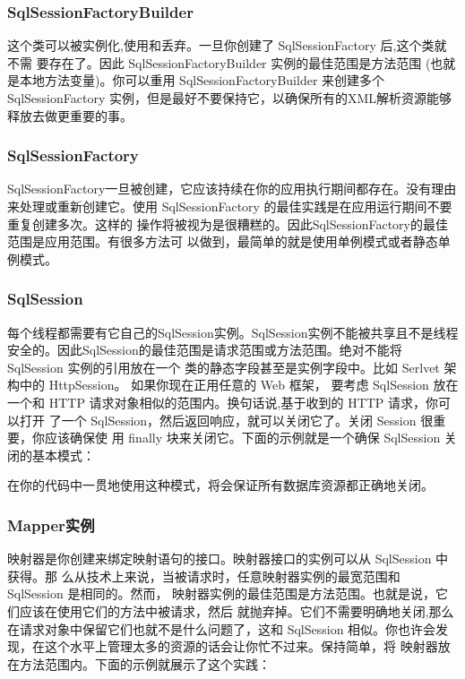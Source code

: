 \subsubsection{SqlSessionFactoryBuilder}
这个类可以被实例化,使用和丢弃。一旦你创建了 SqlSessionFactory 后,这个类就不需 要存在了。因此 SqlSessionFactoryBuilder 实例的最佳范围是方法范围 (也就是本地方法变量)。你可以重用 SqlSessionFactoryBuilder 来创建多个 SqlSessionFactory 实例，但是最好不要保持它，以确保所有的XML解析资源能够释放去做更重要的事。
\subsubsection{SqlSessionFactory}
SqlSessionFactory一旦被创建，它应该持续在你的应用执行期间都存在。没有理由来处理或重新创建它。使用 SqlSessionFactory 的最佳实践是在应用运行期间不要重复创建多次。这样的 操作将被视为是很糟糕的。因此SqlSessionFactory的最佳范围是应用范围。有很多方法可 以做到，最简单的就是使用单例模式或者静态单例模式。
\subsubsection{SqlSession}
每个线程都需要有它自己的SqlSession实例。SqlSession实例不能被共享且不是线程安全的。因此SqlSession的最佳范围是请求范围或方法范围。绝对不能将 SqlSession 实例的引用放在一个 类的静态字段甚至是实例字段中。比如 Serlvet 架构中的 HttpSession。 如果你现在正用任意的 Web 框架， 要考虑 SqlSession 放在一个和 HTTP 请求对象相似的范围内。换句话说,基于收到的 HTTP 请求，你可以打开 了一个 SqlSession，然后返回响应，就可以关闭它了。关闭 Session 很重要，你应该确保使 用 finally 块来关闭它。下面的示例就是一个确保 SqlSession 关闭的基本模式：



在你的代码中一贯地使用这种模式，将会保证所有数据库资源都正确地关闭。
\subsubsection{Mapper实例}
映射器是你创建来绑定映射语句的接口。映射器接口的实例可以从 SqlSession 中获得。那 么从技术上来说，当被请求时，任意映射器实例的最宽范围和 SqlSession 是相同的。然而， 映射器实例的最佳范围是方法范围。也就是说，它们应该在使用它们的方法中被请求，然后 就抛弃掉。它们不需要明确地关闭,那么在请求对象中保留它们也就不是什么问题了，这和 SqlSession 相似。你也许会发现，在这个水平上管理太多的资源的话会让你忙不过来。保持简单，将 映射器放在方法范围内。下面的示例就展示了这个实践：



